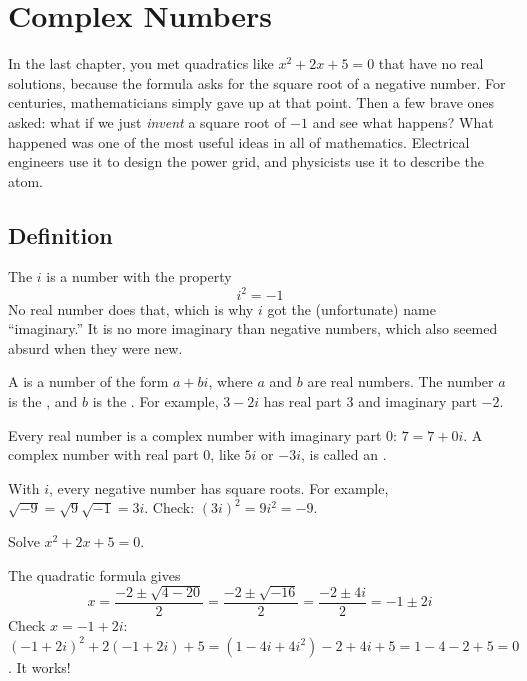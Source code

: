 \chapter{Complex Numbers}

In the last chapter, you met quadratics like $x^2 + 2x + 5 = 0$ that have
no real solutions, because the formula asks for the square root of a
negative number. For centuries, mathematicians simply gave up at that
point. Then a few brave ones asked: what if we just \emph{invent} a square
root of $-1$ and see what happens? What happened was one of the most useful
ideas in all of mathematics. Electrical engineers use it to design the
power grid, and physicists use it to describe the atom.

\section{Definition}

The  $i$ is a number with
the property
$$i^2 = -1$$
No real number does that, which is why $i$ got the (unfortunate) name
``imaginary.'' It is no more imaginary than negative numbers, which
also seemed absurd when they were new.

A  is
a number of the form $a + bi$, where $a$ and $b$ are real numbers. The
number $a$ is the , and $b$ is the
. For example, $3 - 2i$ has
real part 3 and imaginary part $-2$.

Every real number is a complex number with imaginary part 0: $7 = 7 + 0i$.
A complex number with real part 0, like $5i$ or $-3i$, is called an
.

With $i$, every negative number has square roots. For example,
$\sqrt{-9} = \sqrt{9}\sqrt{-1} = 3i$. Check: $(3i)^2 = 9i^2 = -9$.

\begin{Worked}
\begin{Problem}
Solve $x^2 + 2x + 5 = 0$.
\end{Problem}
\begin{Solution}
The quadratic formula gives
$$x = \frac{-2 \pm \sqrt{4 - 20}}{2} = \frac{-2 \pm \sqrt{-16}}{2} = \frac{-2 \pm 4i}{2} = -1 \pm 2i$$
Check $x = -1 + 2i$:
$(-1 + 2i)^2 + 2(-1 + 2i) + 5 = (1 - 4i + 4i^2) - 2 + 4i + 5 = 1 - 4 - 2 + 5 = 0$.
It works!
\end{Solution}
\end{Worked}

